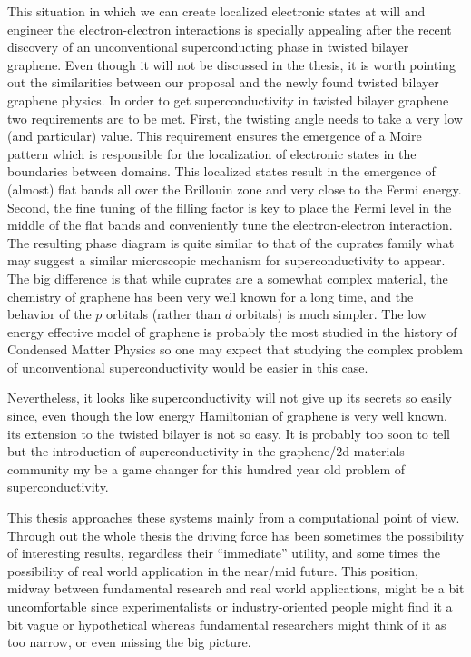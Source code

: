 This situation in which we can create localized electronic states at will and engineer the electron-electron interactions is specially appealing after the recent discovery of an unconventional superconducting phase in twisted bilayer graphene\cite{Cao2018,Cao2018a}.
Even though it will not be discussed in the thesis, it is worth pointing out the similarities between our proposal and the newly found twisted bilayer graphene physics.
In order to get superconductivity in twisted bilayer graphene two requirements are to be met. First, the twisting angle needs to take a very low (and particular) value. This requirement ensures the emergence of a Moire pattern which is responsible for the localization of electronic states in the boundaries between domains. This localized states result in the emergence of (almost) flat bands all over the Brillouin zone and very close to the Fermi energy. Second, the fine tuning of the filling factor is key to place the Fermi level in the middle of the flat bands and conveniently tune the electron-electron interaction.
The resulting phase diagram is quite similar to that of the cuprates family what may suggest a similar microscopic mechanism for superconductivity to appear. The big difference is that while cuprates are a somewhat complex material, the chemistry of graphene has been very well known for a long time, and the behavior of the $p$ orbitals (rather than $d$ orbitals) is much simpler.
The low energy effective model of graphene is probably the most studied in the history of Condensed Matter Physics so one may expect that studying the complex problem of unconventional superconductivity would be easier in this case.

Nevertheless, it looks like superconductivity will not give up its secrets so easily since, even though the low energy Hamiltonian of graphene is very well known, its extension to the twisted bilayer is not so easy.
It is probably too soon to tell but the introduction of superconductivity in the graphene/2d-materials community my be a game changer for this hundred year old problem of superconductivity.
\bigskip



This thesis approaches these systems mainly from a computational point of view.
%
%
Through out the whole thesis the driving force has been sometimes the possibility of interesting results, regardless their ``immediate'' utility, and some times the possibility of real world application in the near/mid future.
This position, midway between fundamental research and real world applications, might be a bit uncomfortable since experimentalists or industry-oriented people might find it a bit vague or hypothetical whereas fundamental researchers might think of it as too narrow, or even missing the big picture.

